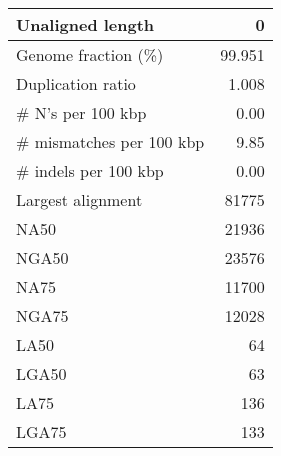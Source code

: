 \documentclass[12pt,a4paper]{article}
\begin{document}
\begin{table}[ht]
\begin{center}
\begin{tabular}{|l*{1}{|r}|}
Unaligned length & 0 \\ \hline
Genome fraction (\%) & 99.951 \\ \hline
Duplication ratio & 1.008 \\ \hline
\# N's per 100 kbp & 0.00 \\ \hline
\# mismatches per 100 kbp & 9.85 \\ \hline
\# indels per 100 kbp & 0.00 \\ \hline
Largest alignment & 81775 \\ \hline
NA50 & 21936 \\ \hline
NGA50 & 23576 \\ \hline
NA75 & 11700 \\ \hline
NGA75 & 12028 \\ \hline
LA50 & 64 \\ \hline
LGA50 & 63 \\ \hline
LA75 & 136 \\ \hline
LGA75 & 133 \\ \hline
\end{tabular}
\end{center}
\end{table}
\end{document}
